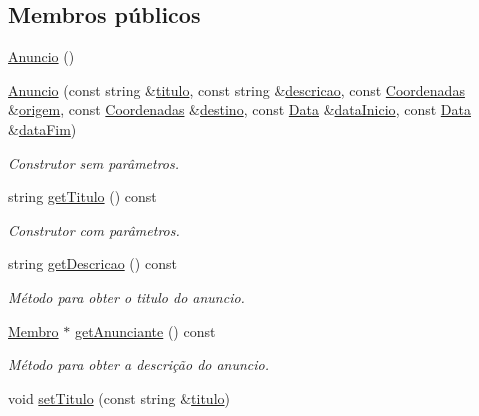 \subsection*{Membros públicos}
\begin{DoxyCompactItemize}
\item 
\hyperlink{class_anuncio_a97da342f390c8ee647d60cf29a923667}{Anuncio} ()
\item 
\hyperlink{class_anuncio_ad0adf24f36f64c2c786871e8f29ad8b5}{Anuncio} (const string \&\hyperlink{class_anuncio_adb34bedd8220f42b9ee37662c21313e6}{titulo}, const string \&\hyperlink{class_anuncio_aa6a9eb8d08cb06d16061b006eb2c8b97}{descricao}, const \hyperlink{class_coordenadas}{Coordenadas} \&\hyperlink{class_anuncio_a9b3f8ac29ebf2a44e24ea2273064a7f5}{origem}, const \hyperlink{class_coordenadas}{Coordenadas} \&\hyperlink{class_anuncio_acdac86595f84cfb8a2bf54c414857168}{destino}, const \hyperlink{class_data}{Data} \&\hyperlink{class_anuncio_abeb7d8c5fe5e7d127005044981a3cd3d}{data\+Inicio}, const \hyperlink{class_data}{Data} \&\hyperlink{class_anuncio_ac3b9182cc541cb68215f8aa09fb0e11a}{data\+Fim})
\begin{DoxyCompactList}\small\item\em Construtor sem parâmetros. \end{DoxyCompactList}\item 
string \hyperlink{class_anuncio_af712423e3645f7127f987d88793127d4}{get\+Titulo} () const 
\begin{DoxyCompactList}\small\item\em Construtor com parâmetros. \end{DoxyCompactList}\item 
string \hyperlink{class_anuncio_a693f59391a620851b4ac37063e8f4af4}{get\+Descricao} () const 
\begin{DoxyCompactList}\small\item\em Método para obter o titulo do anuncio. \end{DoxyCompactList}\item 
\hyperlink{class_membro}{Membro} $\ast$ \hyperlink{class_anuncio_a35c4c8b294b3bdda618a6a0708bf4647}{get\+Anunciante} () const 
\begin{DoxyCompactList}\small\item\em Método para obter a descrição do anuncio. \end{DoxyCompactList}\item 
void \hyperlink{class_anuncio_af95db56a1347160ef1cf53ea1ec659a6}{set\+Titulo} (const string \&\hyperlink{class_anuncio_adb34bedd8220f42b9ee37662c21313e6}{titulo})

\end{DoxyCompactItemize}
